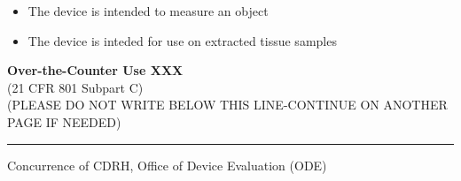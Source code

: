 \begin{itemize}
\item The device is intended to measure an object
\item The device is inteded for use on extracted tissue samples
\end{itemize}

\vfill

\noindent \textbf{Over-the-Counter Use XXX} \\
(21 CFR 801 Subpart C)\\[1em]

\noindent (PLEASE DO NOT WRITE BELOW THIS LINE-CONTINUE ON ANOTHER PAGE IF
NEEDED)

\rule{\linewidth}{0.5mm}
\begin{center}
  Concurrence of CDRH, Office of Device Evaluation (ODE)
\end{center}

\vspace{5em}


